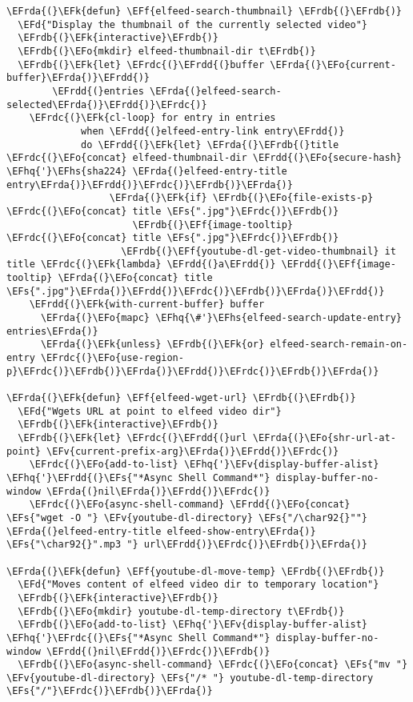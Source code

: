 \documentclass[a4wide,10pt]{article}
\newcommand{\EFs}[1]{\textcolor{EFs}{#1}} %
\newcommand{\EFd}[1]{\textcolor{EFd}{#1}} %
\newcommand{\EFk}[1]{\textcolor{EFk}{#1}} %
\newcommand{\EFf}[1]{\textcolor{EFf}{#1}} %
\newcommand{\EFv}[1]{\textcolor{EFv}{#1}} %
\newcommand{\EFo}[1]{\textcolor{EFo}{#1}} %
\newcommand{\EFhq}[1]{\textcolor{EFhq}{#1}} %
\newcommand{\EFhs}[1]{\textcolor{EFhs}{#1}} %
\newcommand{\EFrda}[1]{\textcolor{EFrda}{#1}} %
\newcommand{\EFrdb}[1]{\textcolor{EFrdb}{#1}} %
\newcommand{\EFrdc}[1]{\textcolor{EFrdc}{#1}} %
\newcommand{\EFrdd}[1]{\textcolor{EFrdd}{#1}} %
\begin{document}
\begin{Code}
\begin{Verbatim}
\EFrda{(}\EFk{defun} \EFf{elfeed-search-thumbnail} \EFrdb{(}\EFrdb{)}
  \EFd{"Display the thumbnail of the currently selected video"}
  \EFrdb{(}\EFk{interactive}\EFrdb{)}
  \EFrdb{(}\EFo{mkdir} elfeed-thumbnail-dir t\EFrdb{)}
  \EFrdb{(}\EFk{let} \EFrdc{(}\EFrdd{(}buffer \EFrda{(}\EFo{current-buffer}\EFrda{)}\EFrdd{)}
        \EFrdd{(}entries \EFrda{(}elfeed-search-selected\EFrda{)}\EFrdd{)}\EFrdc{)}
    \EFrdc{(}\EFk{cl-loop} for entry in entries
             when \EFrdd{(}elfeed-entry-link entry\EFrdd{)}
             do \EFrdd{(}\EFk{let} \EFrda{(}\EFrdb{(}title \EFrdc{(}\EFo{concat} elfeed-thumbnail-dir \EFrdd{(}\EFo{secure-hash} \EFhq{'}\EFhs{sha224} \EFrda{(}elfeed-entry-title entry\EFrda{)}\EFrdd{)}\EFrdc{)}\EFrdb{)}\EFrda{)}
                  \EFrda{(}\EFk{if} \EFrdb{(}\EFo{file-exists-p} \EFrdc{(}\EFo{concat} title \EFs{".jpg"}\EFrdc{)}\EFrdb{)}
                      \EFrdb{(}\EFf{image-tooltip} \EFrdc{(}\EFo{concat} title \EFs{".jpg"}\EFrdc{)}\EFrdb{)}
                    \EFrdb{(}\EFf{youtube-dl-get-video-thumbnail} it title \EFrdc{(}\EFk{lambda} \EFrdd{(}a\EFrdd{)} \EFrdd{(}\EFf{image-tooltip} \EFrda{(}\EFo{concat} title \EFs{".jpg"}\EFrda{)}\EFrdd{)}\EFrdc{)}\EFrdb{)}\EFrda{)}\EFrdd{)}
    \EFrdd{(}\EFk{with-current-buffer} buffer
      \EFrda{(}\EFo{mapc} \EFhq{\#'}\EFhs{elfeed-search-update-entry} entries\EFrda{)}
      \EFrda{(}\EFk{unless} \EFrdb{(}\EFk{or} elfeed-search-remain-on-entry \EFrdc{(}\EFo{use-region-p}\EFrdc{)}\EFrdb{)}\EFrda{)}\EFrdd{)}\EFrdc{)}\EFrdb{)}\EFrda{)}

\EFrda{(}\EFk{defun} \EFf{elfeed-wget-url} \EFrdb{(}\EFrdb{)}
  \EFd{"Wgets URL at point to elfeed video dir"}
  \EFrdb{(}\EFk{interactive}\EFrdb{)}
  \EFrdb{(}\EFk{let} \EFrdc{(}\EFrdd{(}url \EFrda{(}\EFo{shr-url-at-point} \EFv{current-prefix-arg}\EFrda{)}\EFrdd{)}\EFrdc{)}
    \EFrdc{(}\EFo{add-to-list} \EFhq{'}\EFv{display-buffer-alist} \EFhq{'}\EFrdd{(}\EFs{"*Async Shell Command*"} display-buffer-no-window \EFrda{(}nil\EFrda{)}\EFrdd{)}\EFrdc{)}
    \EFrdc{(}\EFo{async-shell-command} \EFrdd{(}\EFo{concat} \EFs{"wget -O "} \EFv{youtube-dl-directory} \EFs{"/\char92{}""} \EFrda{(}elfeed-entry-title elfeed-show-entry\EFrda{)} \EFs{"\char92{}".mp3 "} url\EFrdd{)}\EFrdc{)}\EFrdb{)}\EFrda{)}

\EFrda{(}\EFk{defun} \EFf{youtube-dl-move-temp} \EFrdb{(}\EFrdb{)}
  \EFd{"Moves content of elfeed video dir to temporary location"}
  \EFrdb{(}\EFk{interactive}\EFrdb{)}
  \EFrdb{(}\EFo{mkdir} youtube-dl-temp-directory t\EFrdb{)}
  \EFrdb{(}\EFo{add-to-list} \EFhq{'}\EFv{display-buffer-alist} \EFhq{'}\EFrdc{(}\EFs{"*Async Shell Command*"} display-buffer-no-window \EFrdd{(}nil\EFrdd{)}\EFrdc{)}\EFrdb{)}
  \EFrdb{(}\EFo{async-shell-command} \EFrdc{(}\EFo{concat} \EFs{"mv "} \EFv{youtube-dl-directory} \EFs{"/* "} youtube-dl-temp-directory \EFs{"/"}\EFrdc{)}\EFrdb{)}\EFrda{)}


\end{Verbatim}
\end{Code}
\end{document}
